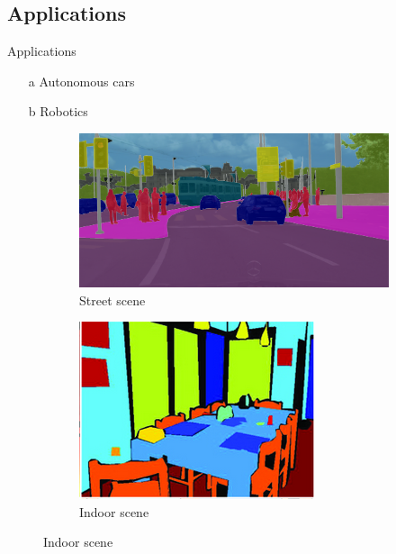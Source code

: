 \documentclass{beamer}
\begin{document}
\subsection{Applications}
\begin{frame}{Applications}
	\begin{itemize}
  \item[a] {
    Autonomous cars
  }
  \item[b] {
    Robotics
  }
  \end{itemize}
  
  \begin{figure}
		\begin{subfigure}{0.3\textwidth}
			\centering
			\includegraphics[width=0.95\linewidth]{images/auto_driving}
			\captionsetup{justification=centering,margin=0.2cm}
			\caption{Street scene \cite{cityscapes}}
		\end{subfigure}
		\begin{subfigure}{0.3\textwidth}
			\centering
			\includegraphics[width=0.8\linewidth]{images/indoor}
			\captionsetup{justification=centering,margin=0.2cm}
			\caption{Indoor scene \cite{indoor}}
		\end{subfigure}
		\label{Fig:app}
	\end{figure}

\end{frame}
\end{document}
